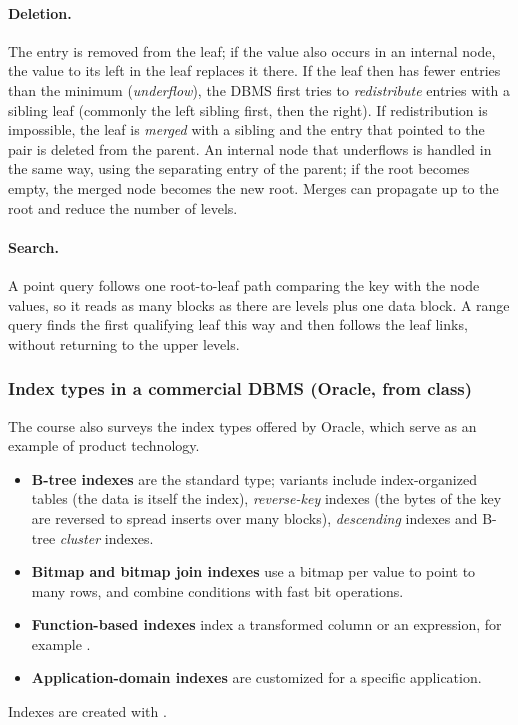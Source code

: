 \paragraph{Deletion.}
The entry is removed from the leaf; if the value also occurs in an internal node, the value to its
left in the leaf replaces it there. If the leaf then has fewer entries than the minimum
(\emph{underflow}), the DBMS first tries to \emph{redistribute} entries with a sibling leaf
(commonly the left sibling first, then the right). If redistribution is impossible, the leaf is
\emph{merged} with a sibling and the entry that pointed to the pair is deleted from the parent. An
internal node that underflows is handled in the same way, using the separating entry of the parent;
if the root becomes empty, the merged node becomes the new root. Merges can propagate up to the
root and reduce the number of levels.

\paragraph{Search.}
A point query follows one root-to-leaf path comparing the key with the node values, so it reads
as many blocks as there are levels plus one data block. A range query finds the first qualifying
leaf this way and then follows the leaf links, without returning to the upper levels.

\subsubsection{Index types in a commercial DBMS (Oracle, from class)}
The course also surveys the index types offered by Oracle, which serve as an example of
product technology.
\begin{itemize}
  \item \textbf{B-tree indexes} are the standard type; variants include index-organized tables
        (the data is itself the index), \emph{reverse-key} indexes (the bytes of the key are
        reversed to spread inserts over many blocks), \emph{descending} indexes and B-tree
        \emph{cluster} indexes.
  \item \textbf{Bitmap and bitmap join indexes} use a bitmap per value to point to many rows, and
        combine conditions with fast bit operations.
  \item \textbf{Function-based indexes} index a transformed column or an expression, for example
        .
  \item \textbf{Application-domain indexes} are customized for a specific application.
\end{itemize}
Indexes are created with .

